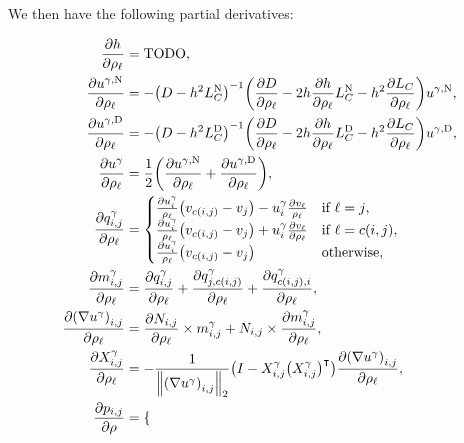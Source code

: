 We then have the following partial derivatives:

\begin{align*}
	\frac{\partial h}{\partial \rho_\ell} &= \text{TODO}, \\
	\frac{\partial u^{\gamma, \text{N}}}{\partial \rho_\ell} &= -\pof{D - h^2L_C^{\text{N}}}^{-1}\pof{\frac{\partial D}{\partial \rho_\ell} - 2h\frac{\partial h}{\partial \rho_\ell}L_C^{\text{N}} - h^2\frac{\partial L_C}{\partial \rho_\ell}}u^{\gamma, \text{N}}, \\
	\frac{\partial u^{\gamma, \text{D}}}{\partial \rho_\ell} &= -\pof{D - h^2L_C^{\text{D}}}^{-1}\pof{\frac{\partial D}{\partial \rho_\ell} - 2h\frac{\partial h}{\partial \rho_\ell}L_C^{\text{D}} - h^2\frac{\partial L_C}{\partial \rho_\ell}}u^{\gamma, \text{D}}, \\
	\frac{\partial u^\gamma}{\partial \rho_\ell} &= \frac{1}{2}\pof{\frac{\partial u^{\gamma, \text{N}}}{\partial \rho_\ell} + \frac{\partial u^{\gamma, \text{D}}}{\partial \rho_\ell}}, \\
	\frac{\partial q^\gamma_{i, j}}{\partial \rho_\ell} &= \begin{cases}
		\frac{\partial u^\gamma_i}{\rho_\ell}\pof{v_{c\pof{i, j}} - v_j} - u^\gamma_i\frac{\partial v_\ell}{\rho_\ell} & \text{if \(\ell = j\)}, \\
		\frac{\partial u^\gamma_i}{\rho_\ell}\pof{v_{c\pof{i, j}} - v_j} + u^\gamma_i\frac{\partial v_\ell}{\partial \rho_\ell} & \text{if \(\ell = c\pof{i, j}\)}, \\
		\frac{\partial u^\gamma_i}{\rho_\ell}\pof{v_{c\pof{i, j}} - v_j} & \text{otherwise},
	\end{cases} \\
	\frac{\partial m^\gamma_{i, j}}{\partial \rho_\ell} &= \frac{\partial q^\gamma_{i, j}}{\partial \rho_\ell} + \frac{\partial q^\gamma_{j, c\pof{i, j}}}{\partial \rho_\ell} + \frac{\partial q^\gamma_{c\pof{i, j}, i}}{\partial \rho_\ell}, \\
	\frac{\partial \pof{\nabla u^\gamma}_{i, j}}{\partial \rho_\ell} &= \frac{\partial N_{i, j}}{\partial \rho_\ell} \times m^\gamma_{i, j} + N_{i, j} \times \frac{\partial m^\gamma_{i, j}}{\partial \rho_\ell}, \\
	\frac{\partial X^\gamma_{i, j}}{\partial \rho_\ell} &= -\frac{1}{\norm{\pof{\nabla u^\gamma}_{i, j}}_2}\pof{I - X^\gamma_{i, j}\pof{X^\gamma_{i, j}}^\intercal}\frac{\partial \pof{\nabla u^\gamma}_{i, j}}{\partial \rho_\ell}, \\
	\frac{\partial p_{i, j}}{\partial \rho} &= \begin{cases}

\end{cases}
\end{align*}
